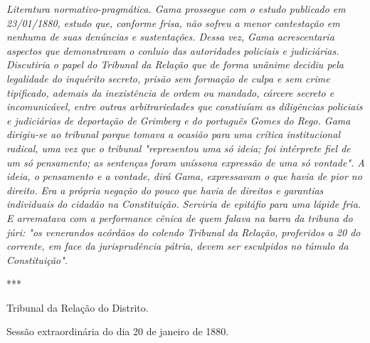 \emph{Literatura normativo-pragmática. Gama prossegue com o estudo
publicado em 23/01/1880, estudo que, conforme frisa, não sofreu a menor
contestação em nenhuma de suas denúncias e sustentações. Dessa vez, Gama
acrescentaria aspectos que demonstravam o conluio das autoridades
policiais e judiciárias. Discutiria o papel do Tribunal da Relação que
de forma unânime decidiu pela legalidade do inquérito secreto, prisão
sem formação de culpa e sem crime tipificado, ademais da inexistência de
ordem ou mandado, cárcere secreto e incomunicável, entre outras
arbitrariedades que constiuíam as diligências policiais e judiciárias de
deportação de Grimberg e do português Gomes do Rego. Gama dirigiu-se ao
tribunal porque tomava a ocasião para uma crítica institucional radical,
uma vez que o tribunal "representou uma só ideia; foi intérprete fiel de
um só pensamento; as sentenças foram uníssona expressão de uma só
vontade". A ideia, o pensamento e a vontade, dirá Gama, expressavam o
que havia de pior no direito. Era a própria negação do pouco que havia
de direitos e garantias individuais do cidadão na Constituição. Serviria
de epitáfio para uma lápide fria. E arrematava com a performance cênica
de quem falava na barra da tribuna do júri: "os venerandos acórdãos do
colendo Tribunal da Relação, proferidos a 20 do corrente, em face da
jurisprudência pátria, devem ser esculpidos no túmulo da Constituição".
}

***

Tribunal da Relação do Distrito.

Sessão extraordinária do dia 20 de janeiro de 1880.


